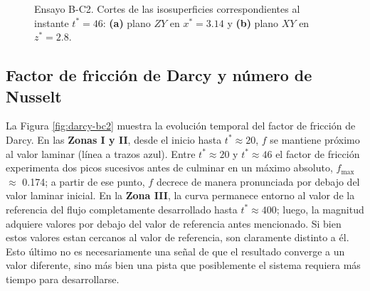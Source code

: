 \begin{figure} %
  \centering  

  \caption{Ensayo B-C2. Cortes de las isosuperficies correspondientes al instante $t^* =46$: \textbf{(a)} plano $ZY$ en $x^*=3\text{.14}$ y \textbf{(b)} plano $XY$ en $z^*=2\text{.8}$.}
  \label{fig:mosaico3-bc2}
\end{figure}




\subsection{Factor de fricción de Darcy y número de Nusselt}
La Figura \ref{fig:darcy-bc2} muestra la evolución temporal del factor de fricción de Darcy. En las \textbf{Zonas I y II}, desde el inicio hasta $t^* \approx 20$, $f$ se mantiene próximo al valor laminar (línea a trazos azul). Entre $t^* \approx 20$ y $t^* \approx 46$ el factor de fricción experimenta dos picos sucesivos antes de culminar en un máximo absoluto, $f_{\max}$ $\approx$ 0.174; a partir de ese punto, $f$ decrece de manera pronunciada por debajo del valor laminar inicial. En la \textbf{Zona III}, la curva permanece entorno al valor de la referencia del flujo completamente desarrollado hasta $t^* \approx 400$; luego, la magnitud adquiere valores por debajo del valor de referencia antes mencionado. Si bien estos valores estan cercanos al valor de referencia, son claramente distinto a él. Esto último no es necesariamente una señal de que el resultado converge a un valor diferente, sino más bien una pista que posiblemente el sistema requiera más tiempo para desarrollarse. 

